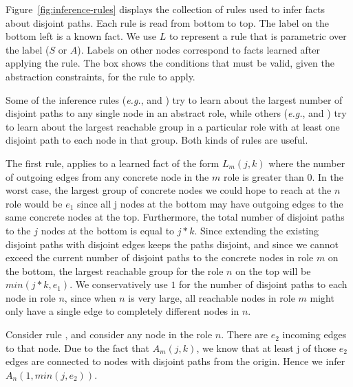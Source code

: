 \documentclass[numbers, 10pt, preprint]{sigplanconf}
\newcommand{\EG}{\emph{e.g.}}
\begin{document}
Figure~\ref{fig:inference-rules} displays the collection of rules used to infer facts about disjoint paths.
Each rule is read from bottom to top. The label on the bottom left is a known fact. We use $L$ to represent a rule that is parametric over the label ($S$ or $A$). Labels on other nodes correspond to facts learned after applying the rule. The box shows the conditions that must be valid, given the abstraction constraints, for the rule to apply. 

Some of the inference rules (\EG,  and ) try to learn about the largest number of disjoint paths to any single node in an abstract role, while others (\EG,  and ) try to learn about the largest reachable group in a particular role with at least one disjoint path to each node in that group. Both kinds of rules are useful. 

The first rule,  applies to a learned fact of the form $L_m(j,k)$ where the number of outgoing edges from any concrete node in the $m$ role is greater than 0. In the worst case, the largest group of concrete nodes we could hope to reach at the $n$ role would be $e_1$ since all j nodes at the bottom may have outgoing edges to the same concrete nodes at the top. Furthermore, the total number of disjoint paths to the $j$ nodes at the bottom is equal to $j*k$. Since extending the existing disjoint paths with disjoint edges keeps the paths disjoint, and since we cannot exceed the current number of disjoint paths to the concrete nodes in role $m$ on the bottom, the largest reachable group for the role $n$ on the top will be $min(j*k,e_1)$.
%
We conservatively use $1$ for the number of disjoint paths to each node in role $n$, since when $n$ is very large, all reachable nodes in role $m$ might only have a single edge to completely different nodes in $n$.

Consider rule , and consider any node in the role $n$. There are $e_2$ incoming edges to that node. Due to the fact that $A_m(j,k)$, we know that at least j of those $e_2$ edges are connected to nodes with disjoint paths from the origin. Hence we infer $A_n(1,min(j,e_2))$.
\end{document}
